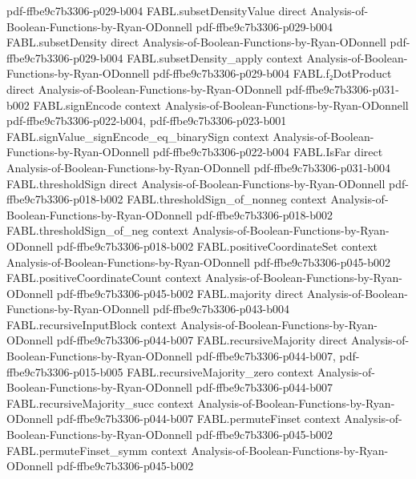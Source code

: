 \begin{theorem}
  {pdf-ffbe9c7b3306-p029-b004}
\proofstep
  {FABL.subsetDensityValue}
  {direct}
  {Analysis-of-Boolean-Functions-by-Ryan-ODonnell}
  {pdf-ffbe9c7b3306-p029-b004}
\proofstep
  {FABL.subsetDensity}
  {direct}
  {Analysis-of-Boolean-Functions-by-Ryan-ODonnell}
  {pdf-ffbe9c7b3306-p029-b004}
\proofstep
  {FABL.subsetDensity_apply}
  {context}
  {Analysis-of-Boolean-Functions-by-Ryan-ODonnell}
  {pdf-ffbe9c7b3306-p029-b004}
\proofstep
  {FABL.f₂DotProduct}
  {direct}
  {Analysis-of-Boolean-Functions-by-Ryan-ODonnell}
  {pdf-ffbe9c7b3306-p031-b002}
\proofstep
  {FABL.signEncode}
  {context}
  {Analysis-of-Boolean-Functions-by-Ryan-ODonnell}
  {pdf-ffbe9c7b3306-p022-b004,
    pdf-ffbe9c7b3306-p023-b001}
\proofstep
  {FABL.signValue_signEncode_eq_binarySign}
  {context}
  {Analysis-of-Boolean-Functions-by-Ryan-ODonnell}
  {pdf-ffbe9c7b3306-p022-b004}
\proofstep
  {FABL.IsFar}
  {direct}
  {Analysis-of-Boolean-Functions-by-Ryan-ODonnell}
  {pdf-ffbe9c7b3306-p031-b004}
\proofstep
  {FABL.thresholdSign}
  {direct}
  {Analysis-of-Boolean-Functions-by-Ryan-ODonnell}
  {pdf-ffbe9c7b3306-p018-b002}
\proofstep
  {FABL.thresholdSign_of_nonneg}
  {context}
  {Analysis-of-Boolean-Functions-by-Ryan-ODonnell}
  {pdf-ffbe9c7b3306-p018-b002}
\proofstep
  {FABL.thresholdSign_of_neg}
  {context}
  {Analysis-of-Boolean-Functions-by-Ryan-ODonnell}
  {pdf-ffbe9c7b3306-p018-b002}
\proofstep
  {FABL.positiveCoordinateSet}
  {context}
  {Analysis-of-Boolean-Functions-by-Ryan-ODonnell}
  {pdf-ffbe9c7b3306-p045-b002}
\proofstep
  {FABL.positiveCoordinateCount}
  {context}
  {Analysis-of-Boolean-Functions-by-Ryan-ODonnell}
  {pdf-ffbe9c7b3306-p045-b002}
\proofstep
  {FABL.majority}
  {direct}
  {Analysis-of-Boolean-Functions-by-Ryan-ODonnell}
  {pdf-ffbe9c7b3306-p043-b004}
\proofstep
  {FABL.recursiveInputBlock}
  {context}
  {Analysis-of-Boolean-Functions-by-Ryan-ODonnell}
  {pdf-ffbe9c7b3306-p044-b007}
\proofstep
  {FABL.recursiveMajority}
  {direct}
  {Analysis-of-Boolean-Functions-by-Ryan-ODonnell}
  {pdf-ffbe9c7b3306-p044-b007,
    pdf-ffbe9c7b3306-p015-b005}
\proofstep
  {FABL.recursiveMajority_zero}
  {context}
  {Analysis-of-Boolean-Functions-by-Ryan-ODonnell}
  {pdf-ffbe9c7b3306-p044-b007}
\proofstep
  {FABL.recursiveMajority_succ}
  {context}
  {Analysis-of-Boolean-Functions-by-Ryan-ODonnell}
  {pdf-ffbe9c7b3306-p044-b007}
\proofstep
  {FABL.permuteFinset}
  {context}
  {Analysis-of-Boolean-Functions-by-Ryan-ODonnell}
  {pdf-ffbe9c7b3306-p045-b002}
\proofstep
  {FABL.permuteFinset_symm}
  {context}
  {Analysis-of-Boolean-Functions-by-Ryan-ODonnell}
  {pdf-ffbe9c7b3306-p045-b002}

\end{theorem}
